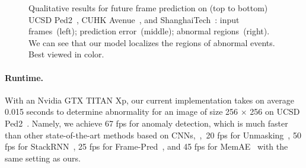 \documentclass[10pt,twocolumn,letterpaper]{article}
\begin{document}
		\begin{figure}
  			\centering
  			\renewcommand*{\thesubfigure}{}
  			\hspace{-0.22cm} 
			\hspace{-0.22cm}
			\vspace{-0.3cm}
			\caption{Qualitative results for future frame prediction on (top to bottom) UCSD Ped2~\cite{li2013anomaly}, CUHK Avenue~\cite{lu2013abnormal}, and ShanghaiTech~\cite{luo2017revisit}: input frames~(left); prediction error~(middle); abnormal regions~(right). We can see that our model localizes the regions of abnormal events. Best viewed in color.}
			\vspace{-0.4cm}
			\label{fig:Qualitative}
		\end{figure}

			
\vspace{-0.4cm}			
		\paragraph{Runtime.}
			With an Nvidia GTX TITAN Xp, our current implementation takes on average 0.015 seconds to determine abnormality for an image of size 256 $\times$ 256 on UCSD Ped2~\cite{li2013anomaly}. Namely, we achieve 67 fps for anomaly detection, which is much faster than other state-of-the-art methods based on CNNs,~\eg,~20 fps for Unmasking~\cite{tudor2017unmasking}, 50 fps for StackRNN~\cite{luo2017revisit}, 25 fps for Frame-Pred~\cite{liu2018future}, and 45 fps for MemAE~\cite{gong2019memorizing} with the same setting as ours. 
\end{document}
